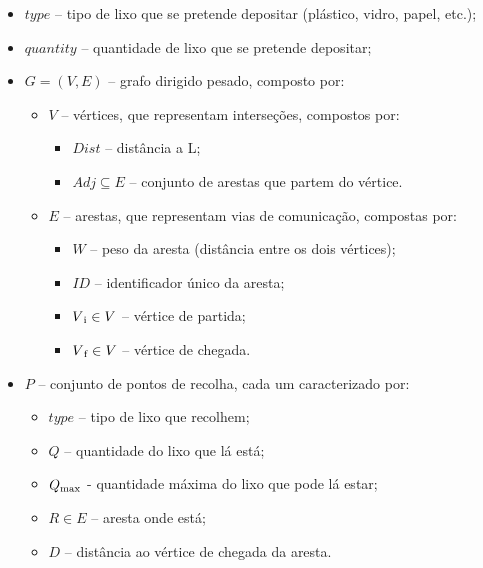 \documentclass[article, a4paper, 12pt, oneside]{memoir}
\begin{document}
\begin{itemize} %

\item $type$ – tipo de lixo que se pretende depositar (plástico, vidro, papel, etc.);
\item $quantity$ – quantidade de lixo que se pretende depositar;
\item $G = (V, E)$ – grafo dirigido pesado, composto por:

	\begin{itemize} %

	\item $V$ – vértices, que representam interseções, compostos por:

		\begin{itemize} %
		\item $Dist$ – distância a L;
		\item $Adj \subseteq E$ – conjunto de arestas que partem do vértice.
		\end{itemize} %

	\end{itemize} %

	\begin{itemize} %

	\item $E$ – arestas, que representam vias de comunicação, compostas por:

		\begin{itemize} %
		\item $W$ – peso da aresta (distância entre os dois vértices);
		\item $ID$ – identificador único da aresta;
		\item $V\textsubscript{i} \in V$ – vértice de partida;
		\item $V\textsubscript{f} \in V$ – vértice de chegada.
		\end{itemize} %

	\end{itemize} %

\item $P$ – conjunto de pontos de recolha, cada um caracterizado por:

	\begin{itemize} %

	\item $type$ – tipo de lixo que recolhem;
	\item $Q$ – quantidade do lixo que lá está;
	\item $Q \textsubscript{max}$ - quantidade máxima do lixo que pode lá estar;
	\item $R \in E$ – aresta onde está;
	\item $D$ – distância ao vértice de chegada da aresta.


\end{itemize}
\end{itemize}
\end{document}
